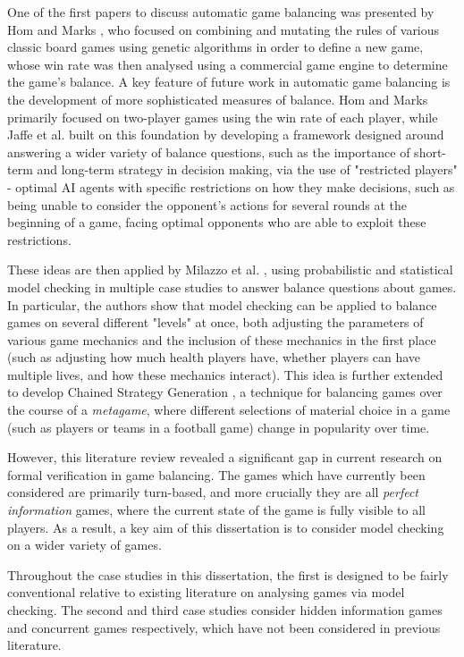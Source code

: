 One of the first papers to discuss automatic game balancing was presented by Hom and Marks \cite{hom_automatic_2007}, who focused on combining and mutating the rules of various classic board games using genetic algorithms in order to define a new game, whose win rate was then analysed using a commercial game engine to determine the game's balance. A key feature of future work in automatic game balancing is the development of more sophisticated measures of balance. Hom and Marks primarily focused on two-player games using the win rate of each player, while Jaffe et al. \cite{jaffe_evaluating_2012} built on this foundation by developing a framework designed around answering a wider variety of balance questions, such as the importance of short-term and long-term strategy in decision making, via the use of "restricted players" - optimal AI agents with specific restrictions on how they make decisions, such as being unable to consider the opponent's actions for several rounds at the beginning of a game, facing optimal opponents who are able to exploit these restrictions.

These ideas are then applied by Milazzo et al. \cite{milazzo_case_2015}, using probabilistic and statistical model checking in multiple case studies to answer balance questions about games. In particular, the authors show that model checking can be applied to balance games on several different "levels" at once, both adjusting the parameters of various game mechanics and the inclusion of these mechanics in the first place (such as adjusting how much health players have, whether players can have multiple lives, and how these mechanics interact). This idea is further extended to develop Chained Strategy Generation \cite{kavanagh_balancing_2019}, a technique for balancing games over the course of a \emph{metagame}, where different selections of material choice in a game (such as players or teams in a football game) change in popularity over time.

However, this literature review revealed a significant gap in current research on formal verification in game balancing. The games which have currently been considered are primarily turn-based, and more crucially they are all \emph{perfect information} games, where the current state of the game is fully visible to all players. As a result, a key aim of this dissertation is to consider model checking on a wider variety of games.

Throughout the case studies in this dissertation, the first is designed to be fairly conventional relative to existing literature on analysing games via model checking. The second and third case studies consider hidden information games and concurrent games respectively, which have not been considered in previous literature.
